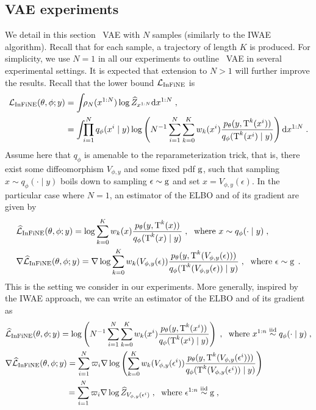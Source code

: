 
\subsection{VAE experiments}
\label{supsec:vae_exps}
We detail in this section \InFiNE\ VAE with $N$ samples (similarly to the IWAE algorithm). Recall that for each sample,  a trajectory of length $K$ is produced. 
For simplicity, we use $N=1$ in all our experiments to outline \IFIS\ VAE in several experimental settings. It is expected that extension to $N > 1$ will further improve the results.
Recall that the  lower bound $\mathcal{L}_{\operatorname{InFiNE}}$ is 
\begin{align*}
    \mathcal{L}_{\operatorname{InFiNE}}(\theta, \phi; y) &= \int_{} \rho_N( x^{1:N})   \log \widehat{Z}_{x^{1:N}} \mathrm{d} x^{1:N}\;,\\
&= \int_{} \prod_{i=1}^N q_\phi(x^i\mid y)   \log\left( N^{-1}\sum_{i=1}^N\sum_{k=0}^K w_k(x^i) \frac{p_\theta(y, \operatorname{T}^k(x^i))}{q_\phi(\operatorname{T}^k(x^i)\mid y)}\right)\mathrm{d} x^{1:N}\;.
\end{align*}
Assume here that $q_\phi$ is amenable to the reparameterization trick, that is, there exist some diffeomorphism $V_{\phi,y}$ and some fixed pdf $\operatorname{g}$, such that sampling $x\sim q_\phi(\cdot\mid y)$ boils down to sampling $\epsilon\sim\operatorname{g}$ and set $x = V_{\phi,y}(\epsilon)$.
In the particular case where $N=1$, an estimator of the ELBO and of its gradient are given by
\begin{align*}
    &\widehat{\mathcal{L}}_{\operatorname{InFiNE}}(\theta, \phi; y) = \log \sum_{k=0}^K w_k(x) \frac{p_\theta(y, \operatorname{T}^k(x))}{q_\phi(\operatorname{T}^k(x)\mid y)}\;, \; \text{ where } x\sim q_\phi(\cdot\mid y)\;,\\
    &\nabla \widehat{\mathcal{L}}_{\operatorname{InFiNE}}(\theta, \phi; y) = \nabla\log \sum_{k=0}^K w_k(V_{\phi,y}(\epsilon)) \frac{p_\theta(y, \operatorname{T}^k(V_{\phi,y}(\epsilon)))}{q_\phi(\operatorname{T}^k(V_{\phi,y}(\epsilon))\mid y)}\;, \; \text{ where } \epsilon \sim \operatorname{g}\;.
\end{align*}
This is the setting we consider in our experiments. More generally, inspired by the IWAE approach, we can write an estimator of the ELBO and of its gradient as
\begin{align}
\label{eq:gradient_elboneq}
\nonumber
    &\widehat{\mathcal{L}}_{\operatorname{InFiNE}} (\theta, \phi; y) = \log\left( N^{-1}\sum_{i=1}^N\sum_{k=0}^K w_k(x^i) \frac{p_\theta(y, \operatorname{T}^k(x^i))}{q_\phi(\operatorname{T}^k(x^i)\mid y)}\right)\;, \; \text{ where } x^{1:n}\overset{\operatorname{iid}}{\sim} q_\phi(\cdot\mid y)\;,\\
    &\nabla \widehat{\mathcal{L}}_{\operatorname{InFiNE}} (\theta, \phi; y) = \sum_{i=1}^N \varpi_i \nabla\log\left( \sum_{k=0}^K w_k(V_{\phi,y}(\epsilon^i)) \frac{p_\theta(y, \operatorname{T}^k(V_{\phi,y}(\epsilon^i)))}{q_\phi(\operatorname{T}^k(V_{\phi,y}(\epsilon^i))\mid y)}\right)\\
&\hspace{2.6cm}=\sum_{i=1}^N \varpi_i \nabla\log\widehat{Z}_{V_{\phi,y}(\epsilon^i)} \;, \; \text{ where } \epsilon^{1:n} \overset{\operatorname{iid}}{\sim} \operatorname{g}\;,
\end{align}
